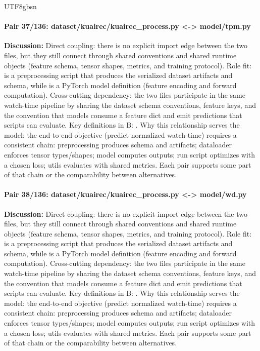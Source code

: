 \documentclass[11pt]{article}
\begin{document}
\begin{CJK*}{UTF8}{gbsn}
\paragraph{Pair 37/136: dataset/kuairec/kuairec\_process.py <-> model/tpm.py}
\textbf{Discussion:} Direct coupling: there is no explicit import edge between the two files, but they still connect through shared conventions and shared runtime objects (feature schema, tensor shapes, metrics, and training protocol). Role fit: \texttt{} is a preprocessing script that produces the serialized dataset artifacts and schema, while \texttt{} is a PyTorch model definition (feature encoding and forward computation). Cross-cutting dependency: the two files participate in the same watch-time pipeline by sharing the dataset schema conventions, feature keys, and the convention that models consume a feature dict and emit predictions that scripts can evaluate. Key definitions in B: \texttt{}. Why this relationship serves the model: the end-to-end objective (predict normalized watch-time) requires a consistent chain: preprocessing produces schema and artifacts; dataloader enforces tensor types/shapes; model computes outputs; run script optimizes with a chosen loss; utils evaluates with shared metrics. Each pair supports some part of that chain or the comparability between alternatives.

\paragraph{Pair 38/136: dataset/kuairec/kuairec\_process.py <-> model/wd.py}
\textbf{Discussion:} Direct coupling: there is no explicit import edge between the two files, but they still connect through shared conventions and shared runtime objects (feature schema, tensor shapes, metrics, and training protocol). Role fit: \texttt{} is a preprocessing script that produces the serialized dataset artifacts and schema, while \texttt{} is a PyTorch model definition (feature encoding and forward computation). Cross-cutting dependency: the two files participate in the same watch-time pipeline by sharing the dataset schema conventions, feature keys, and the convention that models consume a feature dict and emit predictions that scripts can evaluate. Key definitions in B: \texttt{}. Why this relationship serves the model: the end-to-end objective (predict normalized watch-time) requires a consistent chain: preprocessing produces schema and artifacts; dataloader enforces tensor types/shapes; model computes outputs; run script optimizes with a chosen loss; utils evaluates with shared metrics. Each pair supports some part of that chain or the comparability between alternatives.


\end{CJK*}
\end{document}
